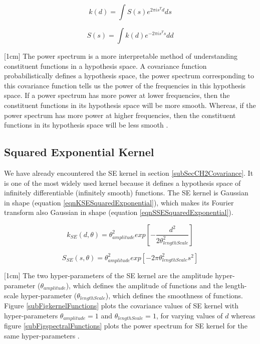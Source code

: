 \begin{equation}\label{eqCh4StationaryCovariance}
    k(d) = \int S(s) e^{2 \pi is^{T} d}ds
\end{equation}

\begin{equation}\label{eqCh4StationaryPowerSpectrum}
    S(s) = \int k(d) e^{-2 \pi is^{T} s}dd 
\end{equation}

[1cm]
The power spectrum is a more interpretable method of understanding constituent functions in a hypothesis space. A covariance function probabilistically defines a hypothesis space, the power spectrum corresponding to this covariance function tells us the power of the frequencies in this hypothesis space. If a power spectrum has more power at lower frequencies, then the constituent functions in its hypothesis space will be more smooth. Whereas, if the power spectrum has more power at higher frequencies, then the constituent functions in its hypothesis space will be less smooth \cite{wilson2014thesis}. 

\subsection{Squared Exponential Kernel}\label{subSecCh4SEKernel}
We have already encountered the SE kernel in section \ref{subSecCH2Covariance}. It is one of the most widely used kernel because it defines a hypothesis space of infinitely differentiable (infinitely smooth) functions. The SE kernel is Gaussian in shape (equation \ref{eqnKSESquaredExponential}), which makes its Fourier transform also Gaussian in shape (equation \ref{eqnSSESquaredExponential}).  

\begin{equation}\label{eqnKSESquaredExponential}
k_{SE}(d, \theta) = \theta_{amplitude}^2exp \left [-\frac{d^2}{2\theta_{lengthScale}^2} \right ]
\end{equation}

\begin{equation}\label{eqnSSESquaredExponential}
S_{SE}(s, \theta) = \theta_{amplitude}^2  exp \left [-2\pi \theta_{lengthScale}^2 s^2 \right]
\end{equation}

[1cm]
The two hyper-parameters of the SE kernel are the amplitude hyper-parameter ($\theta_{amplitude}$), which defines the amplitude of functions and the length-scale hyper-parameter ($\theta_{lengthScale}$), which defines the smoothness of functions. Figure \ref{subFigkernelFunctions} plots the covariance values of SE kernel with hyper-parameters $\theta_{amplitude}=1$ and $\theta_{lengthScale}=1$, for varying values of $d$ whereas figure \ref{subFigspectralFunctions} plots the power spectrum for SE kernel for the same hyper-parameters . 

